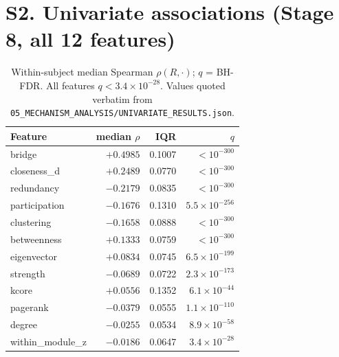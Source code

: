 \documentclass[11pt,a4paper]{article}
\begin{document}
\section{S2. Univariate associations (Stage 8, all 12 features)}
\begin{table}[h]\centering\small
\caption{Within-subject median Spearman $\rho(R,\cdot)$; $q$ = BH-FDR.
All features $q < 3.4\times10^{-28}$. Values quoted verbatim from
\texttt{05\_MECHANISM\_ANALYSIS/UNIVARIATE\_RESULTS.json}.}
\begin{tabular}{lrrr}
\toprule
Feature & median $\rho$ & IQR & $q$ \\
\midrule
bridge & $+0.4985$ & 0.1007 & $<10^{-300}$ \\
closeness\_d & $+0.2489$ & 0.0770 & $<10^{-300}$ \\
redundancy & $-0.2179$ & 0.0835 & $<10^{-300}$ \\
participation & $-0.1676$ & 0.1310 & $5.5\times10^{-256}$ \\
clustering & $-0.1658$ & 0.0888 & $<10^{-300}$ \\
betweenness & $+0.1333$ & 0.0759 & $<10^{-300}$ \\
eigenvector & $+0.0834$ & 0.0745 & $6.5\times10^{-199}$ \\
strength & $-0.0689$ & 0.0722 & $2.3\times10^{-173}$ \\
kcore & $+0.0556$ & 0.1352 & $6.1\times10^{-44}$ \\
pagerank & $-0.0379$ & 0.0555 & $1.1\times10^{-110}$ \\
degree & $-0.0255$ & 0.0534 & $8.9\times10^{-58}$ \\
within\_module\_z & $-0.0186$ & 0.0647 & $3.4\times10^{-28}$ \\
\bottomrule
\end{tabular}
\end{table}
\end{document}
